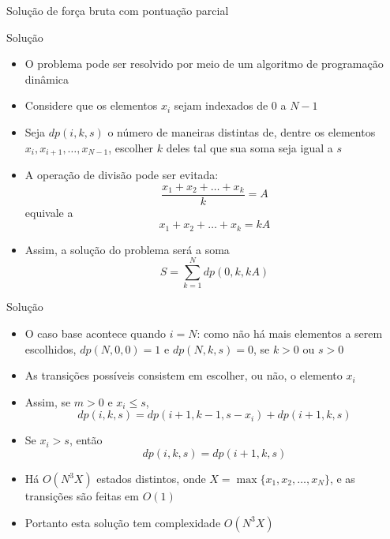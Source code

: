 \begin{frame}[fragile]{Solução de força bruta com pontuação parcial}
\end{frame}

\begin{frame}[fragile]{Solução}

    \begin{itemize}
        \item O problema pode ser resolvido por meio de um algoritmo de programação dinâmica

        \item Considere que os elementos $x_i$ sejam indexados de 0 a $N - 1$

        \item Seja $dp(i, k, s)$ o número de maneiras distintas de, dentre os elementos
            $x_i, x_{i + 1}, \ldots, x_{N - 1}$, escolher $k$ deles tal que sua soma
            seja igual a $s$

        \item A operação de divisão pode ser evitada:
        \[
            \frac{x_1 + x_2 + \ldots + x_k}{k} = A
        \]
        equivale a
        \[
            x_1 + x_2 + \ldots + x_k = kA
        \]

        \item Assim, a solução do problema será a soma
        \[
            S = \sum_{k = 1}^N dp(0, k, kA)
        \]
    \end{itemize}

\end{frame}


\begin{frame}[fragile]{Solução}

    \begin{itemize}
        \item O caso base acontece quando $i = N$: como não há mais elementos a serem escolhidos,
            $dp(N, 0, 0) = 1$ e $dp(N, k, s) = 0$, se $k > 0$ ou $s > 0$

        \item As transições possíveis consistem em escolher, ou não, o elemento $x_i$

        \item Assim, se $m > 0$ e $x_i \leq s$, 
        \[
            dp(i, k, s) = dp(i + 1, k - 1, s - x_i) + dp(i + 1, k, s)
        \]

        \item Se $x_i > s$, então
        \[
            dp(i, k, s) = dp(i + 1, k, s)
        \]

        \item Há $O(N^3X)$ estados distintos, onde $X = \max\{ x_1, x_2, \ldots, x_N \}$, e as
            transições são feitas em $O(1)$

        \item Portanto esta solução tem complexidade $O(N^3X)$
    \end{itemize}

\end{frame}

